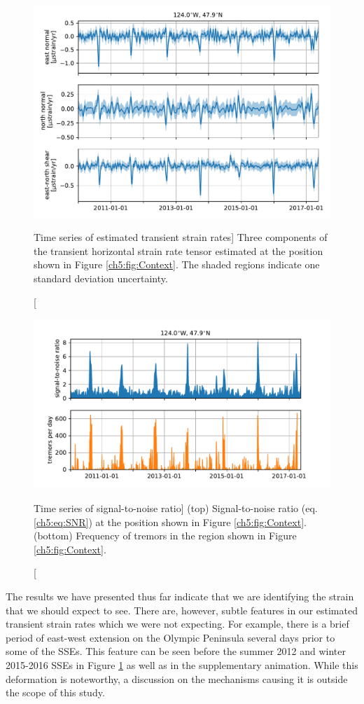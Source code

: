 \begin{figure}
\includegraphics{ch5/figures/strain_ts/strain-ts.pdf}
\caption
[Time series of estimated transient strain rates]
{Three components of the transient horizontal strain rate
tensor estimated at the position shown in Figure
\ref{ch5:fig:Context}. The shaded regions indicate one standard
deviation uncertainty.}
\label{ch5:fig:StrainTs}
\end{figure}

\begin{figure}
\includegraphics{ch5/figures/strain_ts/mag-ts.pdf}
\caption
[Time series of signal-to-noise ratio]
{(top) Signal-to-noise ratio (eq. \ref{ch5:eq:SNR}) at the
position shown in Figure \ref{ch5:fig:Context}. (bottom) Frequency of
tremors in the region shown in Figure \ref{ch5:fig:Context}.}
\label{ch5:fig:StrainMag}
\end{figure}

The results we have presented thus far indicate that we are
identifying the strain that we should expect to see. There are,
however, subtle features in our estimated transient strain rates which
we were not expecting. For example, there is a brief period of
east-west extension on the Olympic Peninsula several days prior to
some of the SSEs. This feature can be seen before the summer 2012 and
winter 2015-2016 SSEs in Figure \ref{ch5:fig:StrainTs} as well as in
the supplementary animation. While this deformation is noteworthy, a
discussion on the mechanisms causing it is outside the scope of this
study.

